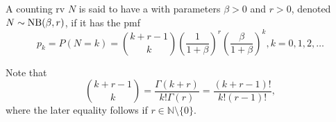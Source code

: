 \documentclass[notoc,notitlepage]{tufte-book}
\begin{document}
\begin{defn}\label{defn:negative_binomial_distribution}
  A counting rv $N$ is said to have a  with parameters $\beta > 0$ and $r > 0$, denoted $N \sim \operatorname{NB}(\beta, r)$, if it has the pmf
  \begin{equation*}
    p_k = P(N = k) = \binom{k + r - 1}{k} \left( \frac{1}{1 + \beta} \right)^r \left( \frac{\beta}{1 + \beta} \right)^k, k = 0, 1, 2, \ldots
  \end{equation*}
\end{defn}

\begin{remark}
  Note that
  \begin{equation*}
    \binom{k + r - 1}{k} = \frac{\Gamma(k + r)}{k! \Gamma(r)} = \frac{(k + r - 1)!}{k! (r - 1)!},
  \end{equation*}
  where the later equality follows if $r \in \mathbb{N} \setminus \{ 0 \}$.
\end{remark}
\end{document}
